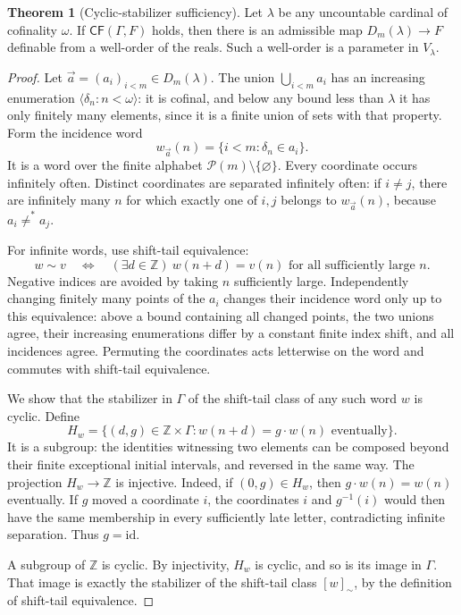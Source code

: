 \documentclass[11pt,letterpaper]{article}
\theoremstyle{definition}
\newtheorem{theorem}[definition]{Theorem}
\numberwithin{equation}{section}
\newcommand{\Pow}{\mathcal P}
\newcommand{\CF}{\mathsf{CF}}
\newcommand{\id}{\mathrm{id}}
\begin{document}
\begin{theorem}[Cyclic-stabilizer sufficiency]\label{thm:sufficiency}
Let $\lambda$ be any uncountable cardinal of cofinality $\omega$. If $\CF(\Gamma,F)$ holds, then there is an admissible map $D_m(\lambda)\to F$ definable from a well-order of the reals. Such a well-order is a parameter in $V_\lambda$.
\end{theorem}
\begin{proof}
Let $\vec a=(a_i)_{i<m}\in D_m(\lambda)$. The union $\bigcup_{i<m}a_i$ has an increasing enumeration $\langle\delta_n:n<\omega\rangle$: it is cofinal, and below any bound less than $\lambda$ it has only finitely many elements, since it is a finite union of sets with that property. Form the incidence word
\[
 w_{\vec a}(n)=\{i<m:\delta_n\in a_i\}.
\]
It is a word over the finite alphabet $\Pow(m)\setminus\{\varnothing\}$. Every coordinate occurs infinitely often. Distinct coordinates are separated infinitely often: if $i\neq j$, there are infinitely many $n$ for which exactly one of $i,j$ belongs to $w_{\vec a}(n)$, because $a_i\neq^*a_j$.

For infinite words, use shift-tail equivalence:
\[
 w\sim v\quad\Longleftrightarrow\quad
 (\exists d\in\mathbb Z)\ w(n+d)=v(n)\text{ for all sufficiently large }n.
\]
Negative indices are avoided by taking $n$ sufficiently large. Independently changing finitely many points of the $a_i$ changes their incidence word only up to this equivalence: above a bound containing all changed points, the two unions agree, their increasing enumerations differ by a constant finite index shift, and all incidences agree. Permuting the coordinates acts letterwise on the word and commutes with shift-tail equivalence.

We show that the stabilizer in $\Gamma$ of the shift-tail class of any such word $w$ is cyclic. Define
\[
 H_w=\{(d,g)\in\mathbb Z\times\Gamma:
          w(n+d)=g\cdot w(n)\text{ eventually}\}.
\]
It is a subgroup: the identities witnessing two elements can be composed beyond their finite exceptional initial intervals, and reversed in the same way. The projection $H_w\to\mathbb Z$ is injective. Indeed, if $(0,g)\in H_w$, then $g\cdot w(n)=w(n)$ eventually. If $g$ moved a coordinate $i$, the coordinates $i$ and $g^{-1}(i)$ would then have the same membership in every sufficiently late letter, contradicting infinite separation. Thus $g=\id$.

A subgroup of $\mathbb Z$ is cyclic. By injectivity, $H_w$ is cyclic, and so is its image in $\Gamma$. That image is exactly the stabilizer of the shift-tail class $[w]_\sim$, by the definition of shift-tail equivalence.


\end{proof}
\end{document}
